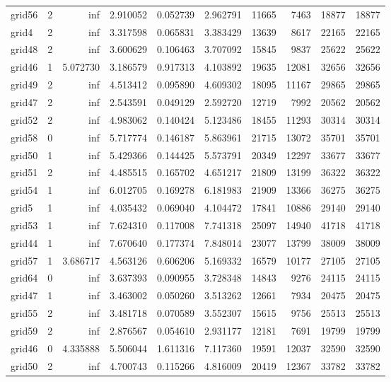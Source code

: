 \begin{longtable}{|l|r|r|r|r|r|r|r|r|r|}
grid56 & 2 & inf & 2.910052 & 0.052739 & 2.962791 & 11665 & 7463 & 18877 & 18877 \\
grid4 & 2 & inf & 3.317598 & 0.065831 & 3.383429 & 13639 & 8617 & 22165 & 22165 \\
grid48 & 2 & inf & 3.600629 & 0.106463 & 3.707092 & 15845 & 9837 & 25622 & 25622 \\
grid46 & 1 & 5.072730 & 3.186579 & 0.917313 & 4.103892 & 19635 & 12081 & 32656 & 32656 \\
grid49 & 2 & inf & 4.513412 & 0.095890 & 4.609302 & 18095 & 11167 & 29865 & 29865 \\
grid47 & 2 & inf & 2.543591 & 0.049129 & 2.592720 & 12719 & 7992 & 20562 & 20562 \\
grid52 & 2 & inf & 4.983062 & 0.140424 & 5.123486 & 18455 & 11293 & 30314 & 30314 \\
grid58 & 0 & inf & 5.717774 & 0.146187 & 5.863961 & 21715 & 13072 & 35701 & 35701 \\
grid50 & 1 & inf & 5.429366 & 0.144425 & 5.573791 & 20349 & 12297 & 33677 & 33677 \\
grid51 & 2 & inf & 4.485515 & 0.165702 & 4.651217 & 21809 & 13199 & 36322 & 36322 \\
grid54 & 1 & inf & 6.012705 & 0.169278 & 6.181983 & 21909 & 13366 & 36275 & 36275 \\
grid5 & 1 & inf & 4.035432 & 0.069040 & 4.104472 & 17841 & 10886 & 29140 & 29140 \\
grid53 & 1 & inf & 7.624310 & 0.117008 & 7.741318 & 25097 & 14940 & 41718 & 41718 \\
grid44 & 1 & inf & 7.670640 & 0.177374 & 7.848014 & 23077 & 13799 & 38009 & 38009 \\
grid57 & 1 & 3.686717 & 4.563126 & 0.606206 & 5.169332 & 16579 & 10177 & 27105 & 27105 \\
grid64 & 0 & inf & 3.637393 & 0.090955 & 3.728348 & 14843 & 9276 & 24115 & 24115 \\
grid47 & 1 & inf & 3.463002 & 0.050260 & 3.513262 & 12661 & 7934 & 20475 & 20475 \\
grid55 & 2 & inf & 3.481718 & 0.070589 & 3.552307 & 15615 & 9756 & 25513 & 25513 \\
grid59 & 2 & inf & 2.876567 & 0.054610 & 2.931177 & 12181 & 7691 & 19799 & 19799 \\
grid46 & 0 & 4.335888 & 5.506044 & 1.611316 & 7.117360 & 19591 & 12037 & 32590 & 32590 \\
grid50 & 2 & inf & 4.700743 & 0.115266 & 4.816009 & 20419 & 12367 & 33782 & 33782 \\

\end{longtable}
